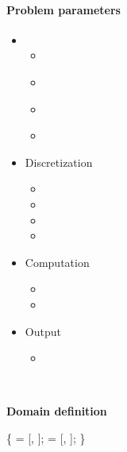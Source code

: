\begin{frame}[fragile] 
\secframetitle{\ssParameters}
\framesubtitle{Problem parameters}
\vspace{-0.2in}
\begin{minipage}[t]{1.7in}
\begin{itemize}
\item {}
  \begin{itemize}
  \item {}
  \item \textcolor{blue}{}
  \item \textcolor{blue}{}
  \item \textcolor{blue}{}
  \end{itemize}
\item Discretization
  \begin{itemize}
  \item {}
  \item {}
  \item {}
  \item {}
  \end{itemize}
\item Computation
  \begin{itemize}
  \item {}
  \item {}
  \end{itemize}
\item Output
  \begin{itemize}
    \item {}
  \end{itemize}
\end{itemize}
\end{minipage} \
\begin{minipage}[t]{2.6in}
\vspace{-0.2in}
\begin{block}{\textbf{Domain definition}}
\footnotesize \vspace{-0.1in}
\begin{semiverbatim}
 \{
    = [, ];
    = [, \valuetext{0.3}];
\} 
\end{semiverbatim}
\end{block}
\end{minipage}
\end{frame}


